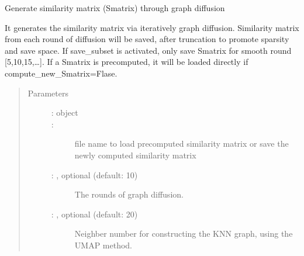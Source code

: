 \documentclass[letterpaper,10pt,english]{sphinxmanual}
\begin{document}
\begin{fulllineitems}
\label{\detokenize{cospar.tmap.generate_similarity_matrix:cospar.tmap.generate_similarity_matrix}}
Generate similarity matrix (Smatrix) through graph diffusion

It generates the similarity matrix via iteratively graph diffusion.
Similarity matrix from each round of diffusion will be saved, after truncation
to promote sparsity and save space. If save\_subset is activated, only save
Smatrix for smooth round {[}5,10,15,…{]}. If a Smatrix is pre\sphinxhyphen{}computed,
it will be loaded directly if compute\_new\_Smatrix=Flase.
\begin{quote}\begin{description}
\item[{Parameters}] \leavevmode\begin{description}
\item[{ :  object}] \leavevmode


\item[{ : }] \leavevmode
file name to load pre\sphinxhyphen{}computed similarity matrix or save the newly
computed similarity matrix

\item[{ : , optional (default: 10)}] \leavevmode
The rounds of graph diffusion.

\item[{ : , optional (default: 20)}] \leavevmode
Neighber number for constructing the KNN graph, using the UMAP method.


\end{description}
\end{description}
\end{quote}
\end{fulllineitems}
\end{document}

